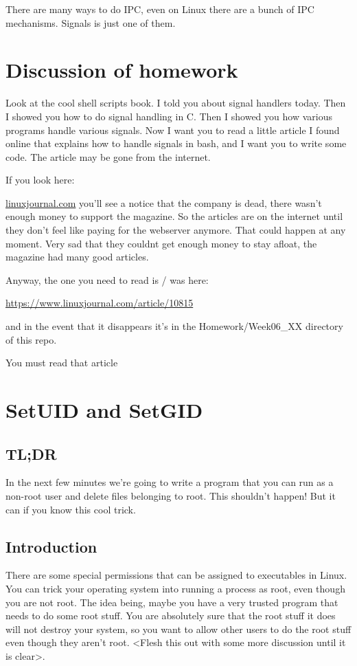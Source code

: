 \documentclass[12pt]{article}
\begin{document}
There are many ways to do IPC, even on Linux there are a bunch of IPC mechanisms. Signals is just one of them.

\section{Discussion of homework}
Look at the cool shell scripts book. I told you about signal handlers today.
Then I showed you how to do signal handling in C. Then I showed you how various
programs handle various signals. Now I want you to read a little article I found
online that explains how to handle signals in bash, and I want you to write some
code. The article may be gone from the internet. 

If you look here:

\url{linuxjournal.com} you'll see a notice that the company is dead, there
wasn't enough money to support the magazine. So the articles are on the internet
until they don't feel like paying for the webserver anymore. That could happen
at any moment. Very sad that they couldnt get enough money to stay afloat, the
magazine had many good articles. 

Anyway, the one you need to read is / was here:

\url{https://www.linuxjournal.com/article/10815} 

and in the event that it disappears it's in the Homework/Week06\_XX directory of
this repo.

You must read that article 

\section{SetUID and SetGID}
\subsection{TL;DR}
In the next few minutes we're going to write a program that you can run as a non-root user and delete  files belonging to root. This shouldn't happen! But it can if you know this cool trick. 

\subsection{Introduction}
There are some special permissions that can be assigned to executables in Linux. You can trick your operating system into running a process as root, even though you are not root. The idea being, maybe you have a very trusted program that needs to do some root stuff. You are absolutely sure that the root stuff it does will not destroy your system, so you want to allow other users to do the root stuff even though they aren't root. <Flesh this out with some more discussion until it is clear>. 
  
\end{document}
